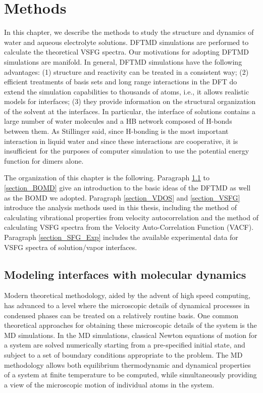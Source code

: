 \raggedbottom
\chapter{Methods}\label{CHAPTER_Methods}
In this chapter, we describe the methods to study the structure and dynamics of water and aqueous electrolyte solutions.
DFTMD simulations are performed to calculate the theoretical VSFG spectra. 
Our motivations for adopting DFTMD simulations are manifold.
In general, DFTMD simulations have the following advantages: 
(1) structure and reactivity can be treated in a consistent way;
(2) efficient treatments of basis sets and long range interactions in the DFT do extend the simulation capabilities to 
thousands of atoms, i.e., it allows realistic models for interfaces;
(3) they provide information on the structural organization of the solvent at the interfaces. 
In particular, the interface of solutions contains a large number of water molecules and a HB network composed of H-bonds between them.
As Stillinger said, since H-bonding is the most important interaction in liquid water and since these interactions 
are cooperative, it is insufficient for the purposes of computer simulation to use the potential energy function for dimers alone\cite{Stillinger1980}.

The organization of this chapter is the following.
Paragraph \ref{section_AIMD} to \ref{section_BOMD} give an introduction to the basic ideas of the DFTMD as well as the BOMD we adopted.
Paragraph \ref{section_VDOS} and \ref{section_VSFG} introduce the analysis methods used in this thesis, including the method of calculating 
vibrational properties from velocity autocorrelation and the method of calculating VSFG spectra from the Velocity Auto-Correlation Function (VACF).
Paragraph \ref{section_SFG_Exp} includes the available experimental data for VSFG spectra of solution/vapor interfaces.

\section{Modeling interfaces with \abinitio molecular dynamics}\label{section_AIMD}
Modern theoretical methodology, aided by the advent of high speed computing, has advanced
to a level where the microscopic details of dynamical processes in condensed phases can be
treated on a relatively routine basis. One common theoretical approaches
for obtaining these microscopic details of the system is the MD simulations.
In the MD simulations, classical Newton equations of motion for
a system are solved numerically starting from a pre-specified initial state, and subject to a set of
boundary conditions appropriate to the problem. The MD methodology allows both equilibrium
thermodynamic and dynamical properties of a system at finite temperature to be computed,
while simultaneously providing a view of the microscopic motion of individual atoms
in the system\cite{Tuckerman2010}.

